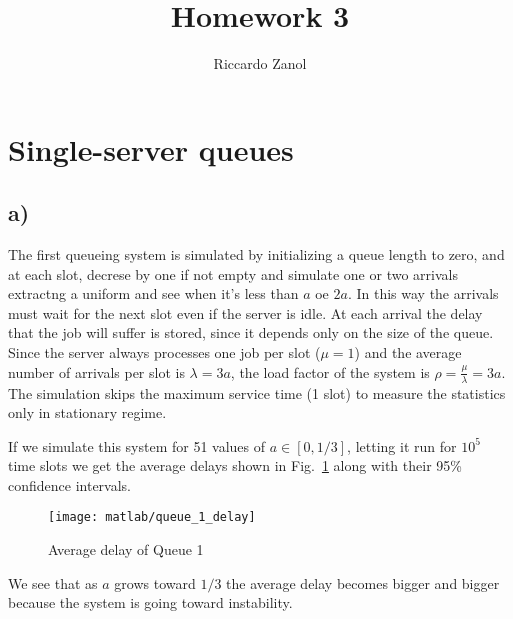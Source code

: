 \documentclass[a4paper,oneside]{article}
\author{Riccardo Zanol}
\title{Homework 3}
\begin{document}
\maketitle
\section{Single-server queues}
\subsection*{a)}
The first queueing system is simulated by initializing a queue length
to zero, and at each slot, decrese by one if not empty and simulate
one or two arrivals extractng a uniform and see when it's less than
$a$ oe $2a$. In this way the arrivals must wait for the next slot even
if the server is idle. At each arrival the delay that the job will
suffer is stored, since it depends only on the size of the
queue. Since the server always processes one job per slot ($\mu = 1$)
and the average number of arrivals per slot is $\lambda = 3a$, the
load factor of the system is $\rho = \frac{\mu}{\lambda} = 3a$. The
simulation skips the maximum service time (1 slot) to measure the
statistics only in stationary regime.

If we simulate this system for 51 values of $a \in [0, 1/3]$, letting
it run for $10^5$ time slots we get the average delays shown in
Fig.~\ref{plot:queue1_delay} along with their 95\% confidence intervals.
\begin{figure}[htbp]
  \centering
    \texttt{[image: matlab/queue\_1\_delay]}
    \caption{Average delay of Queue 1}
    \label{plot:queue1_delay}
\end{figure}
We see that as $a$ grows toward $1/3$ the average delay becomes bigger
and bigger because the system is going toward instability.
\end{document}
